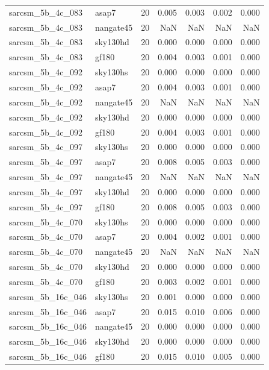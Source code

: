 \begin{tabular}{llrrrrr}
sarcsm\_5b\_4c\_083 & asap7 & 20 & 0.005 & 0.003 & 0.002 & 0.000 \\
sarcsm\_5b\_4c\_083 & nangate45 & 20 & NaN & NaN & NaN & NaN \\
sarcsm\_5b\_4c\_083 & sky130hd & 20 & 0.000 & 0.000 & 0.000 & 0.000 \\
sarcsm\_5b\_4c\_083 & gf180 & 20 & 0.004 & 0.003 & 0.001 & 0.000 \\
sarcsm\_5b\_4c\_092 & sky130hs & 20 & 0.000 & 0.000 & 0.000 & 0.000 \\
sarcsm\_5b\_4c\_092 & asap7 & 20 & 0.004 & 0.003 & 0.001 & 0.000 \\
sarcsm\_5b\_4c\_092 & nangate45 & 20 & NaN & NaN & NaN & NaN \\
sarcsm\_5b\_4c\_092 & sky130hd & 20 & 0.000 & 0.000 & 0.000 & 0.000 \\
sarcsm\_5b\_4c\_092 & gf180 & 20 & 0.004 & 0.003 & 0.001 & 0.000 \\
sarcsm\_5b\_4c\_097 & sky130hs & 20 & 0.000 & 0.000 & 0.000 & 0.000 \\
sarcsm\_5b\_4c\_097 & asap7 & 20 & 0.008 & 0.005 & 0.003 & 0.000 \\
sarcsm\_5b\_4c\_097 & nangate45 & 20 & NaN & NaN & NaN & NaN \\
sarcsm\_5b\_4c\_097 & sky130hd & 20 & 0.000 & 0.000 & 0.000 & 0.000 \\
sarcsm\_5b\_4c\_097 & gf180 & 20 & 0.008 & 0.005 & 0.003 & 0.000 \\
sarcsm\_5b\_4c\_070 & sky130hs & 20 & 0.000 & 0.000 & 0.000 & 0.000 \\
sarcsm\_5b\_4c\_070 & asap7 & 20 & 0.004 & 0.002 & 0.001 & 0.000 \\
sarcsm\_5b\_4c\_070 & nangate45 & 20 & NaN & NaN & NaN & NaN \\
sarcsm\_5b\_4c\_070 & sky130hd & 20 & 0.000 & 0.000 & 0.000 & 0.000 \\
sarcsm\_5b\_4c\_070 & gf180 & 20 & 0.003 & 0.002 & 0.001 & 0.000 \\
sarcsm\_5b\_16c\_046 & sky130hs & 20 & 0.001 & 0.000 & 0.000 & 0.000 \\
sarcsm\_5b\_16c\_046 & asap7 & 20 & 0.015 & 0.010 & 0.006 & 0.000 \\
sarcsm\_5b\_16c\_046 & nangate45 & 20 & 0.000 & 0.000 & 0.000 & 0.000 \\
sarcsm\_5b\_16c\_046 & sky130hd & 20 & 0.000 & 0.000 & 0.000 & 0.000 \\
sarcsm\_5b\_16c\_046 & gf180 & 20 & 0.015 & 0.010 & 0.005 & 0.000 \\

\end{tabular}
